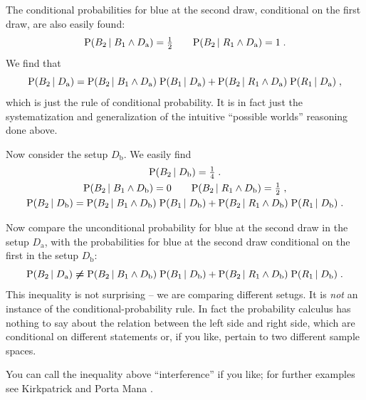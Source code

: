 \documentclass[\ifafour a4paper,12pt,\else a5paper,10pt,\fi%
onecolumn,oneside,article,%
british%
]{memoir}
\theoremstyle{remark}
\theoremstyle{innote}
\newcommand*{\citey}{\parencites*}
\newcommand*{\p}{\mathrm{P}}%
\renewcommand*{\|}[1][]{\nonscript\,#1\vert\nonscript\;\mathopen{}}
\newcommand*{\sect}{\S}%
\newcommand*{\yDa}{D_{\textrm{a}}}
\newcommand*{\yDb}{D_{\textrm{b}}}
\begin{document}
The conditional probabilities for blue at the second draw,
conditional on the first draw, are also easily found:
\begin{equation}
  \label{eq:A_red2cond}
  \p(B_{2} \| B_{1} \land \yDa) = \tfrac{1}{2} \qquad
  \p(B_{2} \| R_{1} \land \yDa) = 1 \;.
\end{equation}
We find that
\begin{equation}
  \label{eq:A_rule}
  \p(B_{2} \| \yDa) =%
  \p(B_{2} \| B_{1} \land \yDa) \; \p( B_{1} \| \yDa) +
  \p(B_{2} \| R_{1} \land \yDa)  \; \p( R_{1} \| \yDa) \;,
\end{equation}
which is just the rule of conditional probability. It is in fact just the
systematization and generalization of the intuitive \enquote{possible
  worlds} reasoning done above.

Now consider the setup $\yDb$. We easily find
\begin{gather}
  \label{eq:B_red2}
  \p(B_{2} \| \yDb) = \tfrac{1}{4} \;.
  \\
  \label{eq:B_red2cond}
  \p(B_{2} \| B_{1} \land \yDb) = 0 \qquad
  \p(B_{2} \| R_{1} \land \yDb) = \tfrac{1}{2} \;,
  \\
  \label{eq:B_rule}
  \p(B_{2} \| \yDb) =%
  \p(B_{2} \| B_{1} \land \yDb) \; \p( B_{1} \| \yDb) +
  \p(B_{2} \| R_{1} \land \yDb)  \; \p( R_{1} \| \yDb) \;.
\end{gather}


\medskip

Now compare the unconditional probability for blue at the second draw in
the setup $\yDa$, with the  probabilities for blue at the second draw
conditional on the first in the setup $\yDb$:
\begin{equation}
  \label{eq:cross_combine}
  \p(B_{2} \| \yDa) \mathrel{\bm{\ne}}
  \p(B_{2} \| B_{1} \land \yDb) \; \p( B_{1} \| \yDb) +
  \p(B_{2} \| R_{1} \land \yDb)  \; \p( R_{1} \| \yDb) \;.
\end{equation}
This inequality is not surprising -- we are comparing different setugs. It
is \emph{not} an instance of the conditional-probability rule. In fact the
probability calculus has nothing to say about the relation between the left
side and right side, which are conditional on different statements or, if
you like, pertain to two different sample spaces.

You can call the inequality above \enquote{interference} if you like; for
further examples see Kirkpatrick
\citey{kirkpatrick2001_r2003,kirkpatrick2002_r2003} and Porta Mana
\citey[\sect~IV]{portamana2003_r2004}.
\end{document}
